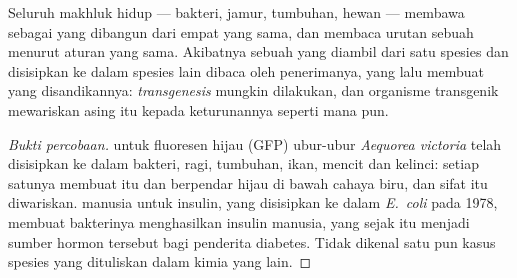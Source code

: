 \begin{proposition}\label{prop:g10:universal-dna:universal}
Seluruh makhluk hidup --- bakteri, jamur, tumbuhan, hewan --- membawa
 sebagai  yang dibangun dari empat 
yang sama, dan membaca urutan sebuah  menurut aturan yang sama.
Akibatnya sebuah  yang diambil dari satu spesies dan disisipkan ke
dalam  spesies lain dibaca oleh  penerimanya, yang lalu membuat
 yang disandikannya: \emph{transgenesis}
mungkin dilakukan, dan organisme transgenik mewariskan  asing itu
kepada keturunannya seperti  mana pun.
\end{proposition}
\begin{proof}[Bukti percobaan]
 untuk  fluoresen hijau (GFP) ubur-ubur \emph{Aequorea
victoria} telah disisipkan ke dalam bakteri, ragi, tumbuhan, ikan,
mencit dan kelinci: setiap satunya membuat  itu dan berpendar
hijau di bawah cahaya biru, dan sifat itu diwariskan.  manusia untuk
insulin, yang disisipkan ke dalam \emph{E.~coli} pada 1978, membuat
bakterinya menghasilkan insulin manusia, yang sejak itu menjadi sumber
hormon tersebut bagi penderita diabetes. Tidak dikenal satu pun kasus
spesies yang  dituliskan dalam kimia yang lain.
\end{proof}

